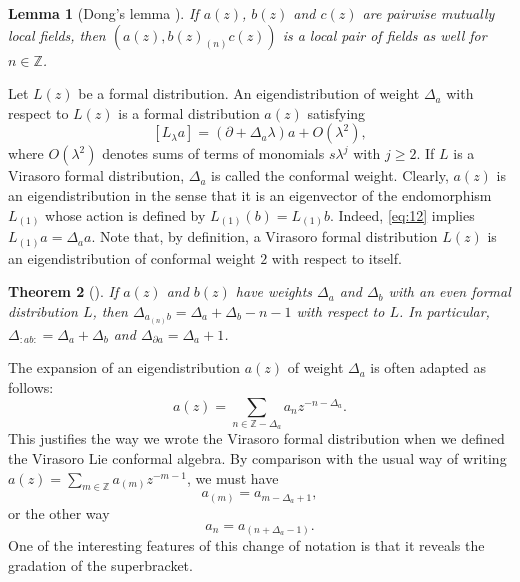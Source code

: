 \documentclass[a4paper, 12pt, reqno]{amsart}
\newtheorem{theorem}{Theorem}[subsection]
\newtheorem{lemma}[theorem]{Lemma}
\theoremstyle{remark}
\numberwithin{equation}{subsection}
\begin{document}
\begin{lemma}[Dong's lemma {\cite[LEMMA 3.2]{kac_vertex_1998}}]
  \label{lmm:2}
  If $a(z)$, $b(z)$ and $c(z)$ are pairwise mutually local fields, then $(a(z),b(z)_{(n)}c(z))$ is a local pair of fields as well for $n\in \mathbb{Z}$.
\end{lemma}

Let $L(z)$ be a formal distribution.
An eigendistribution of weight $\Delta_a$ with respect to $L(z)$ is a formal distribution $a(z)$ satisfying
\begin{equation}
  \label{eq:12}
  [L_{\lambda}a] = (\partial + \Delta_a\lambda)a + O(\lambda^2),
\end{equation}
where $O(\lambda^2)$ denotes sums of terms of monomials $s\lambda^j$ with $j \ge 2$.
If $L$ is a Virasoro formal distribution, $\Delta_a$ is called the conformal weight.
Clearly, $a(z)$ is an eigendistribution in the sense that it is an eigenvector of the endomorphism $L_{(1)}$ whose action is defined by $L_{(1)}(b) = L_{(1)}b$.
Indeed, \eqref{eq:12} implies $L_{(1)}a = \Delta_aa$.
Note that, by definition, a Virasoro formal distribution $L(z)$ is an eigendistribution of conformal weight $2$ with respect to itself.

\begin{theorem}[{\cite[Proposition 3.7.4]{nozaradan_introduction_2008}}]
  \label{thr:8}
  If $a(z)$ and $b(z)$ have weights $\Delta_a$ and $\Delta_b$ with an even formal distribution $L$, then $\Delta_{a_{(n)}b} = \Delta_a + \Delta_b - n - 1$ with respect to $L$.
  In particular, $\Delta_{:ab:} = \Delta_a + \Delta_b$ and $\Delta_{\partial a} = \Delta_a + 1$.
\end{theorem}

The expansion of an eigendistribution $a(z)$ of weight $\Delta_a$ is often adapted as follows:
\begin{equation*}
  a(z) = \sum_{n \in \mathbb{Z} - \Delta_a}a_nz^{-n - \Delta_a}.
\end{equation*}
This justifies the way we wrote the Virasoro formal distribution when we defined the Virasoro Lie conformal algebra.
By comparison with the usual way of writing $a(z) = \sum_{m \in \mathbb{Z}}a_{(m)}z^{-m - 1}$, we must have
\begin{equation*}
  a_{(m)} = a_{m - \Delta_a + 1},
\end{equation*}
or the other way
\begin{equation*}
  a_n = a_{(n + \Delta_a - 1)}.
\end{equation*}
One of the interesting features of this change of notation is that it reveals the gradation of the superbracket.
\end{document}
